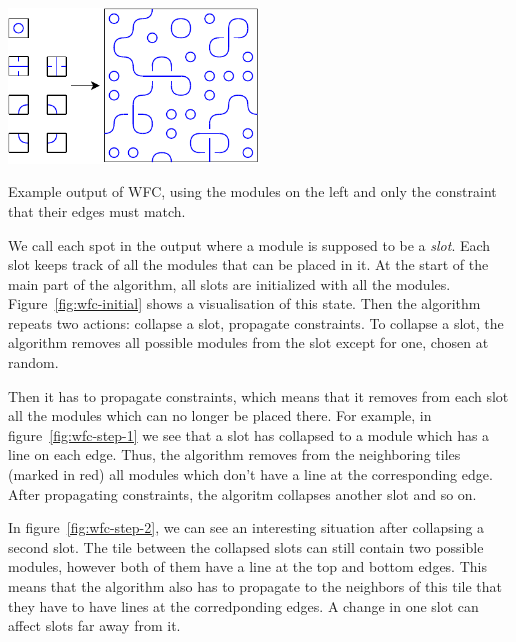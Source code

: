 \begin{center}
    \captionsetup{type=figure}
    \includegraphics[width=0.5\textwidth]{img/WFC modules.pdf}
    \caption{Example output of WFC, using the modules on the left and only the constraint that their edges must match.}
    \label{fig:wfc-modules}
\end{center}

We call each spot in the output where a module is supposed to be a \emph{slot}.
Each slot keeps track of all the modules that can be placed in it.
At the start of the main part of the algorithm, all slots are initialized with all the modules.
Figure~\ref{fig:wfc-initial} shows a visualisation of this state.
Then the algorithm repeats two actions: collapse a slot, propagate constraints.
To collapse a slot, the algorithm removes all possible modules from the slot except for one, chosen at random.

Then it has to propagate constraints, which means that it removes from each slot all the modules which can no longer be placed there.
For example, in figure~\ref{fig:wfc-step-1} we see that a slot has collapsed to a module which has a line on each edge.
Thus, the algorithm removes from the neighboring tiles (marked in red) all modules which don't have a line at the corresponding edge.
After propagating constraints, the algoritm collapses another slot and so on.

In figure~\ref{fig:wfc-step-2}, we can see an interesting situation after collapsing a second slot.
The tile between the collapsed slots can still contain two possible modules, however both of them have a line at the top and bottom edges.
This means that the algorithm also has to propagate to the neighbors of this tile that they have to have lines at the corredponding edges.
A change in one slot can affect slots far away from it.

